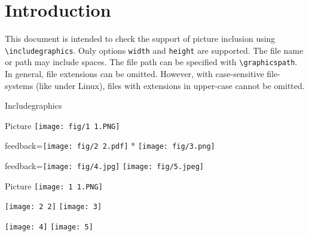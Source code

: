 \documentclass{article}
\begin{document}
\section*{Introduction}

This document is intended to check the support of picture inclusion using 
\verb|\includegraphics|. Only options \texttt{width} and \texttt{height} are 
supported. The file name or path may include spaces. The file path can be 
specified with \verb|\graphicspath|. In general, file extensions can be 
omitted. However, with case-sensitive file-systems (like under Linux), files 
with extensions in upper-case cannot be omitted.

\begin{quiz}{Includegraphics}

\begin{multi}{Picture}
\texttt{[image: fig/1 1.PNG]}
\item[feedback={\texttt{[image: fig/2 2.pdf]}}]* \texttt{[image: fig/3.png]}
\item[feedback={\texttt{[image: fig/4.jpg]}}] \texttt{[image: fig/5.jpeg]}
\end{multi}

\graphicspath{{./fig/}}

\begin{matching}[dd]{Picture}
\texttt{[image: 1 1.PNG]}
\item \texttt{[image: 2 2]} \answer \texttt{[image: 3]}
\item \texttt{[image: 4]} \answer \texttt{[image: 5]}
\end{matching}

\end{quiz}
\end{document}
